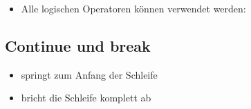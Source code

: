 \begin{frame}
	\slidehead
	\begin{itemize}
		\item Alle logischen Operatoren können verwendet werden:
	\end{itemize}
\end{frame}

\subsection{Continue und break}
\begin{frame}
	\slidehead

	\begin{itemize}
		\item {} springt zum Anfang der Schleife
		\item {} bricht die Schleife komplett ab
	\end{itemize}
\end{frame}

\livecoding



